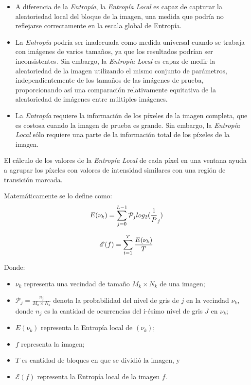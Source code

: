 \begin{itemize}
 \item A diferencia de la \textit{Entropía}, la \textit{Entropía Local} es capaz de capturar la aleatoriedad local del bloque de la imagen, una medida que podría no reflejarse correctamente en la escala global de Entropía.
 \item La \textit{Entropía} podría ser inadecuada como medida universal cuando se trabaja con imágenes de varios tamaños, ya que los resultados podrían ser inconsistentes. Sin embargo, la \textit{Entropía Local} es capaz de medir la aleatoriedad de la imagen utilizando el mismo conjunto de parámetros, independientemente de los tamaños de las imágenes de prueba, proporcionando así una comparación relativamente equitativa de la aleatoriedad de imágenes entre múltiples imágenes.
 \item La \textit{Entropía} requiere la información de los píxeles de la imagen completa, que es costosa cuando la imagen de prueba es grande. Sin embargo, la \textit{Entropía Local} sólo requiere una parte de la información total de los píxeles de la imagen.
\end{itemize}

El cálculo de los valores de la \textit{Entropía Local} de cada píxel en una ventana ayuda a agrupar los píxeles con valores de intensidad similares con una región de transición marcada.

Matemáticamente se lo define como:
\begin{equation}\label{eq:entropialocal}
  \mathcal \mathscr E{(\nu_{k})}=\sum_{j=0}^{L-1}\mathcal P_j log_2(\frac{1}{P}_j)
\end{equation}

\begin{equation}\label{eq:entropialocal2}
  \mathscr{E}(f) =\sum_{i=1}^{T}\mathcal \mathscr \frac{E{(\nu_{k})}}{T}
\end{equation}


Donde:
\begin{itemize} 
    \item $\nu_{k}$ representa una vecindad de tamaño $M_k \times N_k$ de una imagen;
    \item $\mathcal P_j=\frac{n_j}{M_k \times N_k}$ denota la probabilidad del nivel de gris de $j$ en la vecindad $\nu_{k}$, donde $n_j$ es la cantidad de ocurrencias del i-ésimo nivel de gris $J$ en $\nu_{k}$;
    \item $E{(\nu_{k})}$ representa la Entropía local de $(\nu_{k})$;
    \item $f$ representa la imagen;
    \item $T$ es cantidad de bloques en que se dividió la imagen, y
    \item $\mathscr{E}(f)$ representa la Entropía local de la imagen $f$.
\end{itemize}

